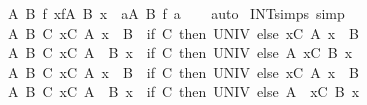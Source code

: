 \begin{isabellebody}
\ \ {\isachardoublequoteopen}{\isasymAnd}A\ B\ f{\isachardot}{\kern0pt}\ {\isacharparenleft}{\kern0pt}{\isasymUnion}x{\isasymin}f{\isacharbackquote}{\kern0pt}A{\isachardot}{\kern0pt}\ B\ x{\isacharparenright}{\kern0pt}\ {\isacharequal}{\kern0pt}\ {\isacharparenleft}{\kern0pt}{\isasymUnion}a{\isasymin}A{\isachardot}{\kern0pt}\ B\ {\isacharparenleft}{\kern0pt}f\ a{\isacharparenright}{\kern0pt}{\isacharparenright}{\kern0pt}{\isachardoublequoteclose}\isanewline
%
\isadelimproof
\ \ %
\endisadelimproof
%
\isatagproof
{}\isamarkupfalse%
\ auto%
\endisatagproof
{\isafoldproof}%
%
\isadelimproof
\isanewline
%
\endisadelimproof
\isanewline
{}\isamarkupfalse%
\ INT{\isacharunderscore}{\kern0pt}simps\ {\isacharbrackleft}{\kern0pt}simp{\isacharbrackright}{\kern0pt}{\isacharcolon}{\kern0pt}\isanewline
\ \ {\isachardoublequoteopen}{\isasymAnd}A\ B\ C{\isachardot}{\kern0pt}\ {\isacharparenleft}{\kern0pt}{\isasymInter}x{\isasymin}C{\isachardot}{\kern0pt}\ A\ x\ {\isasyminter}\ B{\isacharparenright}{\kern0pt}\ {\isacharequal}{\kern0pt}\ {\isacharparenleft}{\kern0pt}if\ C{\isacharequal}{\kern0pt}{\isacharbraceleft}{\kern0pt}{\isacharbraceright}{\kern0pt}\ then\ UNIV\ else\ {\isacharparenleft}{\kern0pt}{\isasymInter}x{\isasymin}C{\isachardot}{\kern0pt}\ A\ x{\isacharparenright}{\kern0pt}\ {\isasyminter}\ B{\isacharparenright}{\kern0pt}{\isachardoublequoteclose}\isanewline
\ \ {\isachardoublequoteopen}{\isasymAnd}A\ B\ C{\isachardot}{\kern0pt}\ {\isacharparenleft}{\kern0pt}{\isasymInter}x{\isasymin}C{\isachardot}{\kern0pt}\ A\ {\isasyminter}\ B\ x{\isacharparenright}{\kern0pt}\ {\isacharequal}{\kern0pt}\ {\isacharparenleft}{\kern0pt}if\ C{\isacharequal}{\kern0pt}{\isacharbraceleft}{\kern0pt}{\isacharbraceright}{\kern0pt}\ then\ UNIV\ else\ A\ {\isasyminter}{\isacharparenleft}{\kern0pt}{\isasymInter}x{\isasymin}C{\isachardot}{\kern0pt}\ B\ x{\isacharparenright}{\kern0pt}{\isacharparenright}{\kern0pt}{\isachardoublequoteclose}\isanewline
\ \ {\isachardoublequoteopen}{\isasymAnd}A\ B\ C{\isachardot}{\kern0pt}\ {\isacharparenleft}{\kern0pt}{\isasymInter}x{\isasymin}C{\isachardot}{\kern0pt}\ A\ x\ {\isacharminus}{\kern0pt}\ B{\isacharparenright}{\kern0pt}\ {\isacharequal}{\kern0pt}\ {\isacharparenleft}{\kern0pt}if\ C{\isacharequal}{\kern0pt}{\isacharbraceleft}{\kern0pt}{\isacharbraceright}{\kern0pt}\ then\ UNIV\ else\ {\isacharparenleft}{\kern0pt}{\isasymInter}x{\isasymin}C{\isachardot}{\kern0pt}\ A\ x{\isacharparenright}{\kern0pt}\ {\isacharminus}{\kern0pt}\ B{\isacharparenright}{\kern0pt}{\isachardoublequoteclose}\isanewline
\ \ {\isachardoublequoteopen}{\isasymAnd}A\ B\ C{\isachardot}{\kern0pt}\ {\isacharparenleft}{\kern0pt}{\isasymInter}x{\isasymin}C{\isachardot}{\kern0pt}\ A\ {\isacharminus}{\kern0pt}\ B\ x{\isacharparenright}{\kern0pt}\ {\isacharequal}{\kern0pt}\ {\isacharparenleft}{\kern0pt}if\ C{\isacharequal}{\kern0pt}{\isacharbraceleft}{\kern0pt}{\isacharbraceright}{\kern0pt}\ then\ UNIV\ else\ A\ {\isacharminus}{\kern0pt}\ {\isacharparenleft}{\kern0pt}{\isasymUnion}x{\isasymin}C{\isachardot}{\kern0pt}\ B\ x{\isacharparenright}{\kern0pt}{\isacharparenright}{\kern0pt}{\isachardoublequoteclose}\isanewline

\end{isabellebody}
